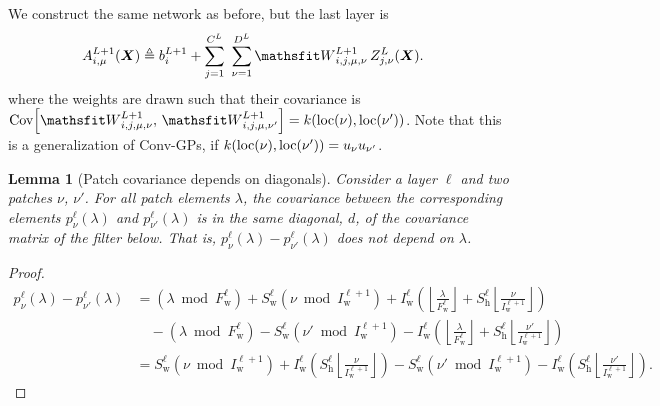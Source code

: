 \documentclass{article} %
\newcommand{\bracket}[3]{{\left#1 #3 \right#2}}
\newcommand{\bra}{\bracket{(}{)}}
\newcommand{\sqb}{\bracket{[}{]}}
\newcommand{\floor}{\bracket{\lfloor}{\rfloor}}
\newcommand{\ssup}[1]{^{#1}}
\newcommand{\eqdef}{\triangleq}
\newcommand{\patch}[2]{{p\ssup{#1}_{#2}}}
\newcommand{\p}[2]{{\patch{\ell #1}{\nu #2}\bra{\lambda}}}
\newcommand{\Iw}[1]{{I\ssup{#1}_\text{w}}}
\newcommand{\Iwl}[1]{\Iw{\ell #1}}
\newcommand{\Sw}[1]{{S\ssup{#1}_\text{w}}}
\newcommand{\Swl}[1]{\Sw{\ell #1}}
\newcommand{\Sh}[1]{{S\ssup{#1}_\text{h}}}
\newcommand{\Shl}[1]{\Sh{\ell #1}}
\newcommand{\Fw}[1]{{F\ssup{#1}_\text{w}}}
\newcommand{\Fwl}[1]{\Fw{\ell #1}}
\newtheorem{lemma}[theorem]{Lemma}
\begin{document}
We construct the same network as before, but the last layer is
\begin{align}
\emA_{i,\mu}\ssup{L+1}(\mX) &\eqdef \evb_i\ssup{L+1} +
\sum_{j=1}^{C\ssup{L}} \ \sum_{\nu=1}^{D\ssup{L}} \etW\ssup{L+1}_{i,j,\mu,\nu}\, \emZ\ssup{L}_{j,\nu}(\mX).
\label{eq:tickgp-network-final}
\end{align}
where the weights are drawn such that their covariance is
$\Cov\sqb{\etW\ssup{L+1}_{i,j,\mu,\nu},\, \etW\ssup{L+1}_{i,j,\mu,\nu'}} =
k(\text{loc}(\nu), \text{loc}(\nu'))$. Note that this is a generalization of
Conv-GPs, if $k(\text{loc}(\nu), \text{loc}(\nu')) = {u}_\nu {u}_{\nu'}$.


\begin{lemma}[Patch covariance depends on diagonals]
  Consider a layer $\ell$ and two patches $\nu$, $\nu'$. For all patch elements $\lambda$, the covariance between the corresponding elements
  $\p{}{}$ and $\p{}{'}$ is in the same diagonal,
  $d$, of the covariance matrix of the filter below. That is,
  $\p{}{} - \p{}{'}$ does not depend on $\lambda$.
  \label{lemma:patches-are-diagonal}
\end{lemma}
\begin{proof}
\begin{align*}
\p{}{}{} - \p{}{'}{}
  &= \bra{\lambda \bmod \Fwl{}} + \Swl{}\bra{\nu\bmod \Iwl{+1}}
  + \Iwl{}\bra{\floor{\frac{\lambda}{\Fwl{}}} + \Shl{} \floor{\frac{\nu}{\Iwl{+1}}}} \\
  &\hspace{1em}- \bra{\lambda \bmod \Fwl{}} - \Swl{}\bra{\nu'\bmod \Iwl{+1}}
    - \Iwl{}\bra{\floor{\frac{\lambda}{\Fwl{}}} + \Shl{} \floor{\frac{\nu'}{\Iwl{+1}}}} \\
  &=\Swl{}\bra{\nu\bmod \Iwl{+1}} +
    \Iwl{}\bra{\Shl{} \floor{\frac{\nu}{\Iwl{+1}}}}
    -\Swl{}\bra{\nu'\bmod \Iwl{+1}} -
    \Iwl{}\bra{\Shl{} \floor{\frac{\nu'}{\Iwl{+1}}}}.
\end{align*}
\end{proof}
\end{document}
